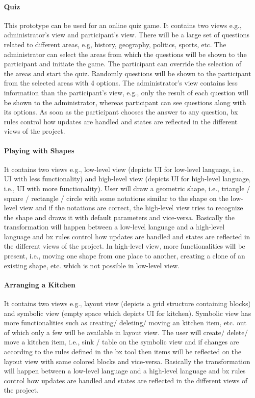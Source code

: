 \paragraph{Quiz} This prototype can be used for an online quiz game. It contains two views e.g., administrator's view and participant's view.
There will be a large set of questions related to different areas, e.g, history, geography, politics, sports, etc. The administrator can select the areas from which the questions will be shown to the participant and initiate the game. The participant can override the selection of the areas and start the quiz. Randomly questions will be shown to the participant from the selected areas with 4 options. The administrator's view contains less information than the participant's view, e.g., only the result of each question will be shown to the administrator, whereas participant can see questions along with its options. As soon as the participant chooses the answer to any question, bx rules control how updates are handled and states are reflected in the different views of the project.

\paragraph{Playing with Shapes} It contains two views e.g., low-level view (depicts \ac{UI} for low-level language, i.e., UI with less functionality) and high-level view (depicts UI for high-level language, i.e., UI with more functionality). User will draw a geometric shape, i.e., triangle / square / rectangle / circle with some notations similar to the shape on the low-level view and if the notations are correct, the high-level view tries to recognize the shape and draws it with default parameters and vice-versa. Basically the transformation will happen between a low-level language and a high-level language and bx rules control how updates are handled and states are reflected in the different views of the project. In high-level view, more functionalities will be present, i.e., moving one shape from one place to another, creating a clone of an existing shape, etc. which is not possible in low-level view.

\paragraph{Arranging a Kitchen}
It contains two views e.g., layout view (depicts a grid structure containing blocks) and symbolic view (empty space which depicts UI for kitchen). Symbolic view has more functionalities such as creating/ deleting/ moving an kitchen item, etc. out of which only a few will be available in layout view. The user will create/ delete/ move a kitchen item, i.e., sink / table on the symbolic view and if changes are according to the rules defined in the bx tool then items will be reflected on the layout view with same colored blocks and vice-versa. Basically the transformation will happen between a low-level language and a high-level language and bx rules control how updates are handled and states are reflected in the different views of the project.

